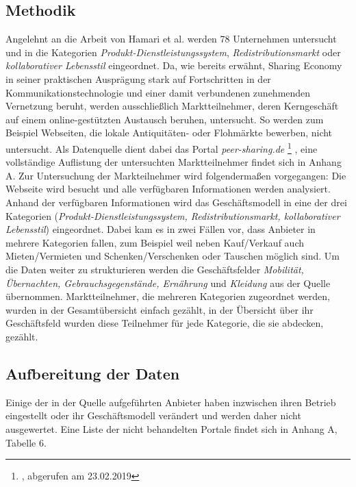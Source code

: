 \documentclass[a4paper]{scrartcl}
\begin{document}
\begin{multicols}{2}
		\subsection{Methodik}
			Angelehnt an die Arbeit von Hamari et al. werden 78 Unternehmen untersucht und in die Kategorien \textit{Produkt-Dienstleistungssystem}, \textit{Redistributionsmarkt} oder \textit{kollaborativer Lebensstil} eingeordnet. Da, wie bereits erw\"ahnt, Sharing Economy in seiner praktischen Auspr\"agung stark auf Fortschritten in der Kommunikationstechnologie und einer damit verbundenen zunehmenden Vernetzung beruht, werden ausschlie\ss lich Marktteilnehmer, deren Kerngesch\"aft auf einem online-gest\"utzten Austausch beruhen, untersucht. So werden zum Beispiel Webseiten, die lokale Antiquit\"aten- oder Flohm\"arkte bewerben, nicht untersucht. Als Datenquelle dient dabei das Portal \textit{peer-sharing.de}
			\footnote{\myurl, abgerufen am 23.02.2019}
			, eine vollst\"andige Auflistung der untersuchten Marktteilnehmer findet sich in Anhang A. Zur Untersuchung der Markteilnehmer wird folgenderma\ss en vorgegangen: Die Webseite wird besucht und alle verf\"ugbaren Informationen werden analysiert. Anhand der verf\"ugbaren Informationen wird das Gesch\"aftsmodell in eine der drei Kategorien (\textit{Produkt-Dienstleistungssystem, Redistributionsmarkt, kollaborativer Lebensstil}) eingeordnet. Dabei kam es in zwei F\"allen vor, dass Anbieter in mehrere Kategorien fallen, zum Beispiel weil neben Kauf/Verkauf auch Mieten/Vermieten und Schenken/Verschenken oder Tauschen m\"oglich sind. Um die Daten weiter zu strukturieren werden die Gesch\"aftsfelder \textit{Mobilit\"at, \"Ubernachten, Gebrauchsgegenst\"ande, Ern\"ahrung} und \textit{Kleidung} aus der Quelle \"ubernommen. Marktteilnehmer, die mehreren Kategorien zugeordnet werden, wurden in der Gesamt\"ubersicht einfach gez\"ahlt, in der \"Ubersicht \"uber ihr Gesch\"aftsfeld wurden diese Teilnehmer f\"ur jede Kategorie, die sie abdecken, gez\"ahlt.
		\subsection{Aufbereitung der Daten}
			Einige der in der Quelle aufgef\"uhrten Anbieter haben inzwischen ihren Betrieb eingestellt oder ihr Gesch\"aftsmodell ver\"andert und werden daher nicht ausgewertet. Eine Liste der nicht behandelten Portale findet sich in Anhang A, Tabelle 6.

\end{multicols}
\end{document}
